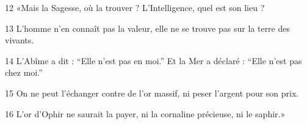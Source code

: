 12 «Mais la Sagesse, où la trouver ? L’Intelligence, quel est son lieu ?

13 L’homme n’en connaît pas la valeur, elle ne se trouve pas sur la terre des vivants.

14 L’Abîme a dit : “Elle n’est pas en moi.” Et la Mer a déclaré : “Elle n’est pas chez moi.”

15 On ne peut l’échanger contre de l’or massif, ni peser l’argent pour son prix.

16 L’or d’Ophir ne saurait la payer, ni la cornaline précieuse, ni le saphir.»
